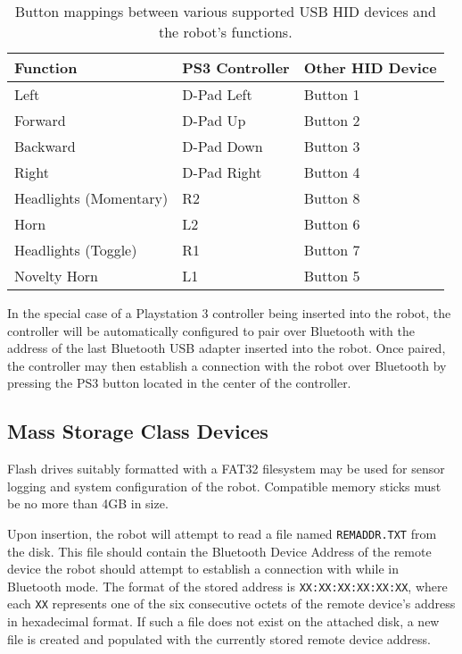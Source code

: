\begin{table}[H]
	\begin{center}
		\begin{tabular}{ | l | l | l |}
			\hline
			\textbf{Function}		& \textbf{PS3 Controller}	& \textbf{Other HID Device} \\ \hline

			Left					& D-Pad Left				& Button 1	\\ \hline
			Forward					& D-Pad Up					& Button 2	\\ \hline
			Backward				& D-Pad Down				& Button 3	\\ \hline
			Right					& D-Pad Right				& Button 4	\\ \hline
			Headlights (Momentary)	& R2						& Button 8	\\ \hline
			Horn					& L2						& Button 6	\\ \hline
			Headlights (Toggle)		& R1						& Button 7	\\ \hline
			Novelty Horn			& L1						& Button 5	\\ \hline

		\end{tabular}
		\caption[USB HID robot button mappings]{Button mappings between various supported USB HID devices and the robot's functions.}
		\label{tab:robotbuttonmappings}
	\end{center}
\end{table}

In the special case of a Playstation 3 controller being inserted into the robot, the controller will be automatically configured to pair over Bluetooth with the address of the last Bluetooth USB adapter inserted into the robot. Once paired, the controller may then establish a connection with the robot over Bluetooth by pressing the PS3 button located in the center of the controller.

\subsection{Mass Storage Class Devices}

Flash drives suitably formatted with a FAT32 filesystem may be used for sensor logging and system configuration of the robot. Compatible memory sticks must be no more than 4GB in size.

Upon insertion, the robot will attempt to read a file named \texttt{REMADDR.TXT} from the disk. This file should contain the Bluetooth Device Address of the remote device the robot should attempt to establish a connection with while in Bluetooth mode. The format of the stored address is \texttt{XX:XX:XX:XX:XX:XX}, where each \texttt{XX} represents one of the six consecutive octets of the remote device's address in hexadecimal format. If such a file does not exist on the attached disk, a new file is created and populated with the currently stored remote device address.

